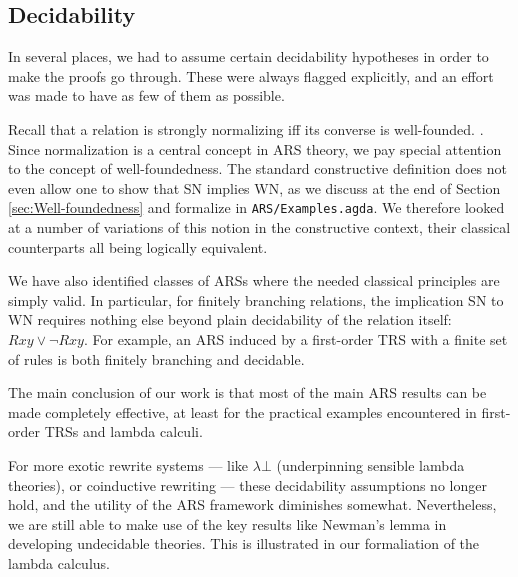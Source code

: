 \subsection{Decidability}
In several places, we had to assume certain decidability hypotheses in order to make
the proofs go through.  These were always flagged explicitly, and an effort was made to
have as few of them as possible.

Recall that a relation is strongly normalizing iff its converse is well-founded. \cite[Def.1.1.13]{Terese}.
Since normalization is a central concept in ARS theory,
we pay special attention to the concept of well-foundedness.
The standard constructive definition does not even allow one to show that SN implies WN,
as we discuss at the end of Section \ref{sec:Well-foundedness} and formalize in \texttt{ARS/Examples.agda}. We therefore looked at a number of variations of this notion in the constructive context,
their classical counterparts all being logically equivalent. %

We have also identified classes of ARSs where the needed classical principles are simply valid.  In particular, for finitely branching relations, the implication SN to WN requires nothing else beyond plain decidability of the relation itself: $Rxy \lor \lnot Rxy$.  For example, an ARS induced by a first-order TRS with a finite set of rules is both finitely branching and decidable.

The main conclusion of our work is that most of the main ARS results can be made completely effective, at least for the practical examples encountered in first-order TRSs and lambda calculi.

For more exotic rewrite systems --- like $\lambda \bot$ (underpinning sensible lambda theories), or coinductive rewriting ---
these decidability assumptions no longer hold, and the utility of the ARS framework diminishes somewhat.
Nevertheless, we are still able to make use of the key results like Newman's lemma in developing undecidable theories.
This is illustrated in our formaliation of the lambda calculus.

